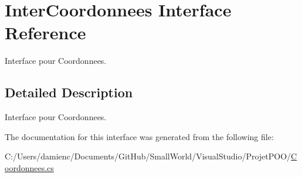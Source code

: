 \hypertarget{interface_inter_coordonnees}{\section{Inter\-Coordonnees Interface Reference}
\label{interface_inter_coordonnees}
}


Interface pour Coordonnees.  




\subsection{Detailed Description}
Interface pour Coordonnees. 

The documentation for this interface was generated from the following file\-:\begin{DoxyCompactItemize}
\item 
C\-:/\-Users/damienc/\-Documents/\-Git\-Hub/\-Small\-World/\-Visual\-Studio/\-Projet\-P\-O\-O/\hyperlink{_coordonnees_8cs}{Coordonnees.\-cs}\end{DoxyCompactItemize}
